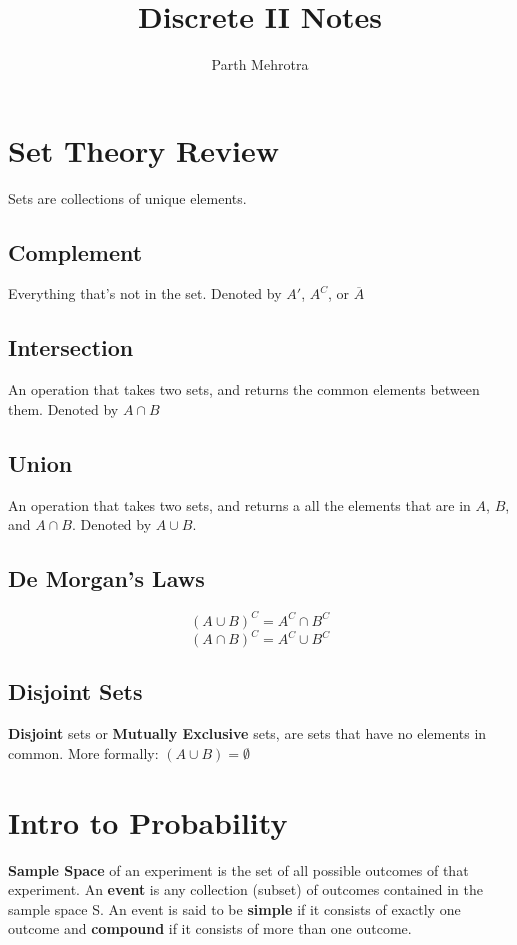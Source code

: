 \documentclass{article}
\begin{document}
	\title{Discrete II Notes}
	\author{Parth Mehrotra}
	\maketitle

	\setlength{\parindent}{0cm} {
		\section*{\Large{\textbf{Set Theory Review}}}

			Sets are collections of unique elements.

			\subsection*{Complement}
				Everything that's not in the set. Denoted by \(A'\),  \(A^C\), or \(\overline{A}\)
			\subsection*{Intersection}
				An operation that takes two sets, and returns the common elements between them. Denoted by \(A \cap B\)

			\subsection*{Union}
				An operation that takes two sets, and returns a all the elements that are in \(A\), \(B\), and \(A \cap B\). Denoted by \( A \cup B \).

			\subsection*{De Morgan's Laws}
				\[ (A \cup B)^C = A^C \cap B^C \]
				\[ (A \cap B)^C = A^C \cup B^C \]

			\subsection*{Disjoint Sets}
				\textbf{Disjoint} sets or \textbf{Mutually Exclusive} sets, are sets that have no elements in common. More formally: \((A \cup B) = \emptyset\)

		\section*{\Large{\textbf{Intro to Probability}}}
			\textbf{Sample Space} of an experiment is the set of all possible outcomes of that experiment.
			An \textbf{event} is any collection (subset) of outcomes contained in the sample space S. An event is said to be \textbf{simple} if it consists of exactly one outcome and \textbf{compound} if it consists of more than one outcome.

}
\end{document}
